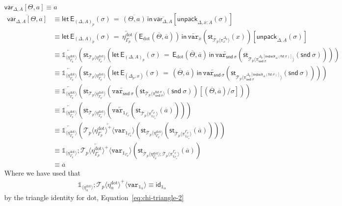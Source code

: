 \documentclass[10pt]{article}
\theoremstyle{definition}
\newcommand\dsd[1]{\ensuremath{\mathsf{#1}}}
\newcommand{\app}[2]{\ensuremath{#1 \: #2}}
\newcommand{\fst}[1]{\app{\dsd{fst}}{#1}}
\newcommand{\snd}[1]{\app{\dsd{snd}}{#1}}
\newcommand{\id}{\mathsf{id}}
\newcommand{\rewrite}[2]{\overleftarrow{#1}(#2)}
\newcommand\StI[2]{\ensuremath{\mathsf{st}_{#1}(#2)}}
\newcommand\EEs[4]{\ensuremath{\mathsf{let} \, \mathsf{E}_{#1}(#3) \, = \, {#2} \, \mathsf{in} \, #4}}
\newcommand\EIs[2]{\ensuremath{\mathsf{E}_{#1}{(#2)}}}
\newcommand\ApEl[2]{\mathcal{T}_{#1}\langle#2\rangle}
\newcommand\ApPlus[2]{\ensuremath{{#1}^+ \langle #2 \rangle }}
\newcommand\unpack[2]{\ensuremath{\mathsf{unpack}_{#1}(#2)}}
\newcommand{\modeof}[1]{{#1}_p}
\newcommand{\sdot}{\ensuremath{\mathrm{dot}}}
\newcommand{\upstairs}[1]{\overline{#1}}
\newcommand\qvar[1]{\ensuremath{\mathsf{var}_{#1}}}
\newcommand\One{\ensuremath{\mathds{1}}}
\newcommand\var[1]{\ensuremath{\mathtt{var}_{#1}}}
\newcommand\ApOne[1]{\ensuremath{\One_{\langle {#1} \rangle }}}
\begin{document}
\begin{enumerate}[style = multiline, labelwidth = 80pt]
\item[{$\qvar{\Delta,A}[\Theta, a] \equiv a$}]
\begin{align*}
\upstairs{\qvar{\Delta,A}[\Theta, a]}
&\equiv \EEs{\modeof{(\Delta, A)}}{\upstairs{(\Theta, a)}}{\sigma}{\upstairs{\qvar{\Delta,A}}[\unpack{\Delta, x : A}{\sigma}]} \\
&\equiv \EEs{\modeof{(\Delta, A)}}{\rewrite{\eta^\sdot_{\modeof{\Gamma}}}{\EIs{\sdot}{\upstairs{\Theta}, \upstairs{a}}}}{\sigma}{\rewrite{\var{x}}{\StI{\ApEl{p}{\pi^{\modeof{\Delta}}_x}}{x}}[\unpack{\Delta, A}{\sigma}]} \\
&\equiv \rewrite{\ApOne{\eta^\sdot_{\modeof{\Gamma}}}}{\StI{\ApEl{p}{\eta^\sdot_{\modeof{\Gamma}}}}{\EEs{\modeof{(\Delta, A)}}{\EIs{\sdot}{\upstairs{\Theta}, \upstairs{a}}}{\sigma}{\rewrite{\var{\snd \sigma}}{\StI{\ApEl{p}{\pi^{\modeof{\Delta}[\unpack{\Delta}{\fst \sigma}]}_{\snd \sigma}}}{\snd \sigma}}}}} \\
&\equiv \rewrite{\ApOne{\eta^\sdot_{\modeof{\Gamma}}}}{\StI{\ApEl{p}{\eta^\sdot_{\modeof{\Gamma}}}}{\EEs{(\modeof{\Delta}, x)}{(\upstairs{\Theta}, \upstairs{a})}{\sigma}{\rewrite{\var{\snd \sigma}}{\StI{\ApEl{p}{\pi^{\modeof{\Delta}[\unpack{\Delta}{\fst \sigma}]}_{\snd \sigma}}}{\snd \sigma}}}}} \\
&\equiv \rewrite{\ApOne{\eta^\sdot_{\modeof{\Gamma}}}}{\StI{\ApEl{p}{\eta^\sdot_{\modeof{\Gamma}}}}{\rewrite{\var{\snd \sigma}}{\StI{\ApEl{p}{\pi^{\fst \sigma}_{\snd \sigma}}}{\snd \sigma}}[(\upstairs{\Theta}, \upstairs{a})/\sigma]}} \\
&\equiv \rewrite{\ApOne{\eta^\sdot_{\modeof{\Gamma}}}}{\StI{\ApEl{p}{\eta^\sdot_{\modeof{\Gamma}}}}{\rewrite{\var{\One_{\modeof{\Gamma}}}}{\StI{\ApEl{p}{\pi^{\modeof{\Gamma}}_{\One_{\modeof{\Gamma}}}}}{\upstairs{a}}}}} \\
&\equiv \rewrite{\ApOne{\eta^\sdot_{\modeof{\Gamma}}}}{\rewrite{\ApPlus{\ApEl{p}{\eta^\sdot_{\modeof{\Gamma}}}}{\var{\One_{\modeof{\Gamma}}}}}{\StI{\ApEl{p}{\eta^\sdot_{\modeof{\Gamma}}}}{\StI{\ApEl{p}{\pi^{\modeof{\Gamma}}_{\One_{\modeof{\Gamma}}}}}{\upstairs{a}}}}} \\
&\equiv \rewrite{\ApOne{\eta^\sdot_{\modeof{\Gamma}}};\ApPlus{\ApEl{p}{\eta^\sdot_{\modeof{\Gamma}}}}{\var{\One_{\modeof{\Gamma}}}}}{\StI{\ApEl{p}{\eta^\sdot_{\modeof{\Gamma}}};\ApEl{p}{\pi^{\modeof{\Gamma}}_{\One_{\modeof{\Gamma}}}}}{\upstairs{a}}} \\
&\equiv \upstairs{a}
\end{align*}
Where we have used that
\begin{align*}
\ApOne{\eta^\sdot_\alpha};\ApPlus{\ApEl{p}{\eta^\sdot_\alpha}}{\var{\One_\alpha}} \equiv \id_{\One_\alpha}
\end{align*}
by the triangle identity for $\sdot$, Equation~\eqref{eq:chi-triangle-2}


\end{enumerate}
\end{document}
